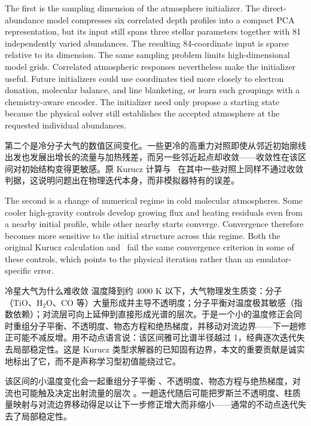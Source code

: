 \begin{EN}
The first is the sampling dimension of the atmosphere initializer. The
direct-abundance model compresses six correlated depth profiles into a compact
PCA representation, but its input still spans three stellar parameters
together with 81 independently varied abundances. The resulting 84-coordinate
input is sparse relative to its dimension. The same sampling problem limits
high-dimensional model grids. Correlated atmospheric
responses nevertheless make the initializer useful. Future
initializers could use coordinates tied more closely to electron donation,
molecular balance, and line blanketing, or learn such groupings with a
chemistry-aware encoder. The initializer need only propose a starting state
because the physical solver still establishes the accepted atmosphere at the
requested individual abundances.
\end{EN}

第二个是冷分子大气的数值区间变化。一些更冷的高重力对照即使从邻近初始廓线出发也发展出增长的流量与加热残差，而另一些邻近起点却收敛——收敛性在该区间对初始结构变得更敏感。原 Kurucz 计算与 \paynezero\ 在其中一些对照上同样不通过收敛判据，这说明问题出在物理迭代本身，而非模拟器特有的误差。

\begin{EN}
The second is a change of numerical regime in cold molecular atmospheres. Some
cooler high-gravity controls develop growing flux and heating residuals even
from a nearby initial profile, while other nearby starts converge. Convergence
therefore becomes more sensitive to the initial structure across this regime.
Both the original Kurucz calculation and \paynezero\ fail the same convergence
criterion in some of these controls, which points to the physical iteration
rather than an emulator-specific error.
\end{EN}

\begin{physbox}{冷星大气为什么难收敛}
温度降到约 4000 K 以下，大气物理发生质变：分子（TiO、H$_2$O、CO 等）大量形成并主导不透明度；分子平衡对温度极其敏感（指数依赖）；对流层可向上延伸到直接形成光谱的层次。于是一个小的温度修正会同时重组分子平衡、不透明度、物态方程和绝热梯度，并移动对流边界——下一趟修正可能不减反增。用不动点语言说：该区间雅可比谱半径越过 1，经典逐次迭代失去局部稳定性。这是 Kurucz 类型求解器的已知固有边界，本文的重要贡献是诚实地标出了它，而不是声称学习型初值能绕过它。
\end{physbox}

该区间的小温度变化会一起重组分子平衡 \citep{BarklemCollet2016}、不透明度、物态方程与绝热梯度，对流也可能触及决定出射流量的层次 \citep{Gustafsson2008}。一趟迭代随后可能把罗斯兰不透明度、柱质量映射与对流边界移动得足以让下一步修正增大而非缩小——通常的不动点迭代失去了局部稳定性。

